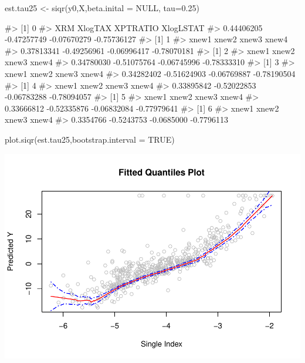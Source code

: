 \begin{Schunk}
\begin{Sinput}
est.tau25 <- siqr(y0,X,beta.inital = NULL, tau=0.25)
\end{Sinput}
\begin{Soutput}
#> [1] 0
#>         XRM     XlogTAX    XPTRATIO   XlogLSTAT 
#>  0.44406205 -0.47257749 -0.07670279 -0.75736127 
#> [1] 1
#>       xnew1       xnew2       xnew3       xnew4 
#>  0.37813341 -0.49256961 -0.06996417 -0.78070181 
#> [1] 2
#>       xnew1       xnew2       xnew3       xnew4 
#>  0.34780030 -0.51075764 -0.06745996 -0.78333310 
#> [1] 3
#>       xnew1       xnew2       xnew3       xnew4 
#>  0.34282402 -0.51624903 -0.06769887 -0.78190504 
#> [1] 4
#>       xnew1       xnew2       xnew3       xnew4 
#>  0.33895842 -0.52022853 -0.06783288 -0.78094057 
#> [1] 5
#>       xnew1       xnew2       xnew3       xnew4 
#>  0.33666812 -0.52335876 -0.06832084 -0.77979641 
#> [1] 6
#>      xnew1      xnew2      xnew3      xnew4 
#>  0.3354766 -0.5243753 -0.0685000 -0.7796113
\end{Soutput}
\begin{Sinput}
plot.siqr(est.tau25,bootstrap.interval = TRUE)
\end{Sinput}

\includegraphics{siqr_files/figure-latex/unnamed-chunk-2-1} \end{Schunk}

